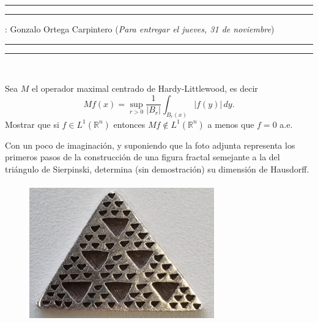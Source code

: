 \documentclass[11pt,a4paper]{article}
\begin{document}
\hrule\hrule
\vspace{2mm}


\vspace{3mm}

 : Gonzalo Ortega Carpintero \hfill ({\it Para entregar el jueves, 31 de noviembre})

\vspace{2mm}

\hrule\hrule 

\vspace{2mm}

\


\vskip 3mm

 Sea $M$ el operador maximal centrado de Hardy-Littlewood, es decir
$$
Mf(x)=\sup_{r>0} \frac 1{|B_r|}\int_{B_r(x)}|f(y)|\, dy.
$$
Mostrar que si $f\in L^1(\mathbb R^n)$ entonces $Mf\notin L^1(\mathbb R^n)$ a menos que $f=0$ a.e.
\vskip 2mm

\vskip 6mm

  Con un poco de imaginación, y suponiendo que la foto adjunta representa los primeros pasos de la construcción de una figura fractal semejante a la del triángulo de Sierpinski, determina (sin demostración) su dimensión de Hausdorff.
 \begin{figure}[h] 
   \includegraphics[width=80mm, height=60mm] {triangle.png}    
\end{figure}

 
 
 
 \vskip 6mm
\end{document}
